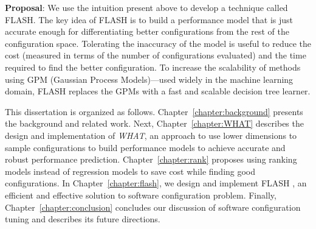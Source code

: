 \noindent\textbf{Proposal}:
We use the intuition present above to develop a technique called FLASH.
The key idea of FLASH is to build a performance model
that is just accurate enough for differentiating better configurations
from the rest of the configuration space. Tolerating
the inaccuracy of the model is useful to reduce the cost
(measured in terms of the number of configurations evaluated)
and the time required to find the better configuration.
To increase the scalability of methods using GPM (Gaussian Process Models)---used widely in the machine learning domain, FLASH
replaces the GPMs with a fast and scalable decision tree learner.




This dissertation is organized as follows.
Chapter~\ref{chapter:background} presents the background and related work.
Next, Chapter~\ref{chapter:WHAT} describes the design and implementation
of \emph{WHAT}, an approach to use lower dimensions to sample configurations to build performance models to achieve accurate and robust performance prediction.
Chapter~\ref{chapter:rank} proposes using ranking models instead of regression models to save cost while finding good configurations.
In Chapter~\ref{chapter:flash}, we design and implement FLASH
, an efficient and  effective solution to software configuration problem.
Finally, Chapter~\ref{chapter:conclusion} concludes our discussion of software configuration tuning and describes its future directions.
